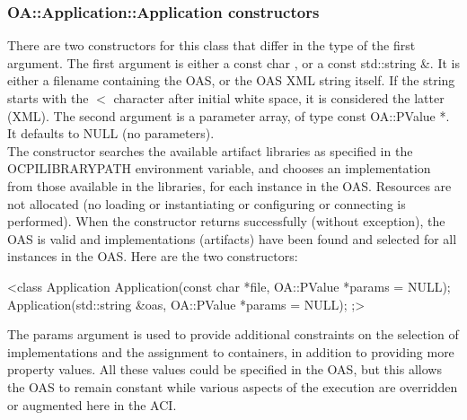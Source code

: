 \documentclass[10pt, a4paper, oneside]{article}
\renewcommand\_{\textunderscore\allowbreak} %
\begin{document}
\subsubsection{OA::Application::Application constructors}There are two constructors for this class that differ in the type of the first argument. The first argument is either a const char \*, or a const std::string \&. It is either a filename containing the OAS, or the OAS XML string itself.  If the string starts with the $<$ character after initial white space, it is considered the latter (XML). The second argument is a parameter array, of type const OA::PValue *. It defaults to NULL (no parameters).\\

The constructor searches the available artifact libraries as specified in the OCPI\_LIBRARY\_PATH environment variable, and chooses an implementation from those available in the libraries, for each instance in the OAS.  Resources are not allocated (no loading or instantiating or configuring or connecting is performed). When the constructor returns successfully (without exception), the OAS is valid and implementations (artifacts) have been found and selected for all instances in the OAS.
Here are the two constructors:\begin{ocpixml}
	<class Application {
	Application(const char *file, OA::PValue *params = NULL);
	Application(std::string &oas, OA::PValue *params = NULL);
 	};>  \end{ocpixml}
The params argument is used to provide additional constraints on the selection of implementations and the assignment to containers, in addition to providing more property values.  All these values could be specified in the OAS, but this allows the OAS to remain constant while various aspects of the execution are overridden or augmented here in the ACI.\\
\end{document}
